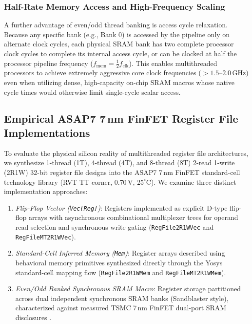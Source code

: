 \subsubsection{Half-Rate Memory Access and High-Frequency Scaling}
A further advantage of even/odd thread banking is access cycle relaxation. Because any specific bank (e.g., Bank 0) is accessed by the pipeline only on alternate clock cycles, each physical SRAM bank has two complete processor clock cycles to complete its internal access cycle, or can be clocked at half the processor pipeline frequency ($f_{\text{mem}} = \frac{1}{2} f_{\text{clk}}$). This enables multithreaded processors to achieve extremely aggressive core clock frequencies ($>1.5\text{--}2.0\,\text{GHz}$) even when utilizing dense, high-capacity on-chip SRAM macros whose native cycle times would otherwise limit single-cycle scalar access.

\subsection{Empirical ASAP7 7\,nm FinFET Register File Implementations} \label{subsec:asap7_mt_regfile}

To evaluate the physical silicon reality of multithreaded register file architectures, we synthesize 1-thread (1T), 4-thread (4T), and 8-thread (8T) 2-read 1-write (2R1W) 32-bit register file designs into the ASAP7 7\,nm FinFET standard-cell technology library (RVT TT corner, $0.70\,\text{V}$, $25^\circ\text{C}$). We examine three distinct implementation approaches:
\begin{enumerate}
    \item \textit{Flip-Flop Vector (\texttt{Vec[Reg]})}: Registers implemented as explicit D-type flip-flop arrays with asynchronous combinational multiplexer trees for operand read selection and synchronous write gating (\texttt{RegFile2R1WVec} and \texttt{RegFileMT2R1WVec}).
    
    \item \textit{Standard-Cell Inferred Memory (\texttt{Mem})}: Register arrays described using behavioral memory primitives synthesized directly through the Yosys standard-cell mapping flow (\texttt{RegFile2R1WMem} and \texttt{RegFileMT2R1WMem}).
    
    \item \textit{Even/Odd Banked Synchronous SRAM Macro}: Register storage partitioned across dual independent synchronous SRAM banks (Sandblaster style), characterized against measured TSMC 7\,nm FinFET dual-port SRAM disclosures \cite{fujiwara2019sram}.
\end{enumerate}

